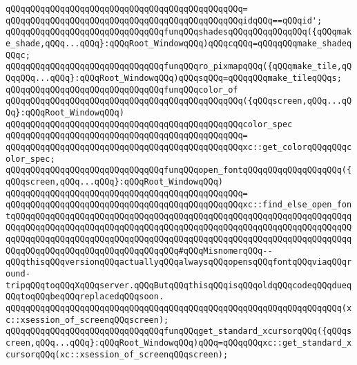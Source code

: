 \verb|qQQqqQQqqQQqqQQqqQQqqQQqqQQqqQQqqQQqqQQqqQQqqQQq=|\newline
\verb|qQQqqQQqqQQqqQQqqQQqqQQqqQQqqQQqqQQqqQQqqQQqqQQqidqQQq==qQQqid';|\newline
\newline
\verb|qQQqqQQqqQQqqQQqqQQqqQQqqQQqqQQqfunqQQqshadesqQQqqQQqqQQqqQQq({qQQqmake_shade,qQQq...qQQq}:qQQqRoot_WindowqQQq)qQQqcqQQq=qQQqqQQqmake_shadeqQQqc;|\newline
\verb|qQQqqQQqqQQqqQQqqQQqqQQqqQQqqQQqfunqQQqro_pixmapqQQq({qQQqmake_tile,qQQqqQQq...qQQq}:qQQqRoot_WindowqQQq)qQQqsqQQq=qQQqqQQqmake_tileqQQqs;|\newline
\newline
\verb|qQQqqQQqqQQqqQQqqQQqqQQqqQQqqQQqfunqQQqcolor_of|\newline
\verb|qQQqqQQqqQQqqQQqqQQqqQQqqQQqqQQqqQQqqQQqqQQqqQQq({qQQqscreen,qQQq...qQQq}:qQQqRoot_WindowqQQq)|\newline
\verb|qQQqqQQqqQQqqQQqqQQqqQQqqQQqqQQqqQQqqQQqqQQqqQQqcolor_spec|\newline
\verb|qQQqqQQqqQQqqQQqqQQqqQQqqQQqqQQqqQQqqQQqqQQqqQQq=|\newline
\verb|qQQqqQQqqQQqqQQqqQQqqQQqqQQqqQQqqQQqqQQqqQQqqQQqxc::get_colorqQQqqQQqcolor_spec;|\newline
\newline
\verb|qQQqqQQqqQQqqQQqqQQqqQQqqQQqqQQqfunqQQqopen_fontqQQqqQQqqQQqqQQqqQQq({qQQqscreen,qQQq...qQQq}:qQQqRoot_WindowqQQq)|\newline
\verb|qQQqqQQqqQQqqQQqqQQqqQQqqQQqqQQqqQQqqQQqqQQqqQQq=|\newline
\verb|qQQqqQQqqQQqqQQqqQQqqQQqqQQqqQQqqQQqqQQqqQQqqQQqxc::find_else_open_fontqQQqqQQqqQQqqQQqqQQqqQQqqQQqqQQqqQQqqQQqqQQqqQQqqQQqqQQqqQQqqQQqqQQqqQQqqQQqqQQqqQQqqQQqqQQqqQQqqQQqqQQqqQQqqQQqqQQqqQQqqQQqqQQqqQQqqQQqqQQqqQQqqQQqqQQqqQQqqQQqqQQqqQQqqQQqqQQqqQQqqQQqqQQqqQQqqQQqqQQqqQQqqQQqqQQqqQQqqQQqqQQqqQQqqQQqqQQqqQQqqQQq#qQQqMisnomerqQQq--qQQqthisqQQqversionqQQqactuallyqQQqalwaysqQQqopensqQQqfontqQQqviaqQQqround-tripqQQqtoqQQqXqQQqserver.qQQqButqQQqthisqQQqisqQQqoldqQQqcodeqQQqdueqQQqtoqQQqbeqQQqreplacedqQQqsoon.|\newline
\verb|qQQqqQQqqQQqqQQqqQQqqQQqqQQqqQQqqQQqqQQqqQQqqQQqqQQqqQQqqQQqqQQqqQQq(xc::xsession_of_screenqQQqscreen);|\newline
\newline
\verb|qQQqqQQqqQQqqQQqqQQqqQQqqQQqqQQqfunqQQqget_standard_xcursorqQQq({qQQqscreen,qQQq...qQQq}:qQQqRoot_WindowqQQq)qQQq=qQQqqQQqxc::get_standard_xcursorqQQq(xc::xsession_of_screenqQQqscreen);|\newline
